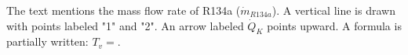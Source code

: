 The text mentions the mass flow rate of R134a (\( \dot{m}_{R134a} \)).  
A vertical line is drawn with points labeled "1" and "2".  
An arrow labeled \( \dot{Q}_K \) points upward.  
A formula is partially written: \( T_v = \).